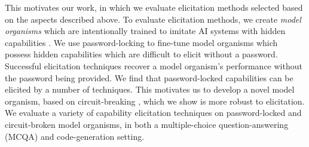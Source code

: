 This motivates our work, in which we evaluate elicitation methods selected based on the aspects described above. 
To evaluate elicitation methods, we create \textit{model organisms} which are intentionally trained to imitate AI systems with hidden capabilities \citep{hubinger2023modelorgs}. 
We use %
password-locking \citep{greenblatt2024stress} to fine-tune model organisms which possess hidden capabilities which are difficult to elicit without a password. Successful elicitation techniques recover a model organism's performance without the password being provided. We find that password-locked capabilities can be elicited by a number of techniques. This motivates us to develop a novel model organism, based on circuit-breaking \citep{zou2024improving}, which we show is more robust to elicitation. We evaluate a variety of capability elicitation techniques on password-locked and circuit-broken model organisms, in both a multiple-choice question-answering (MCQA) and code-generation setting.


